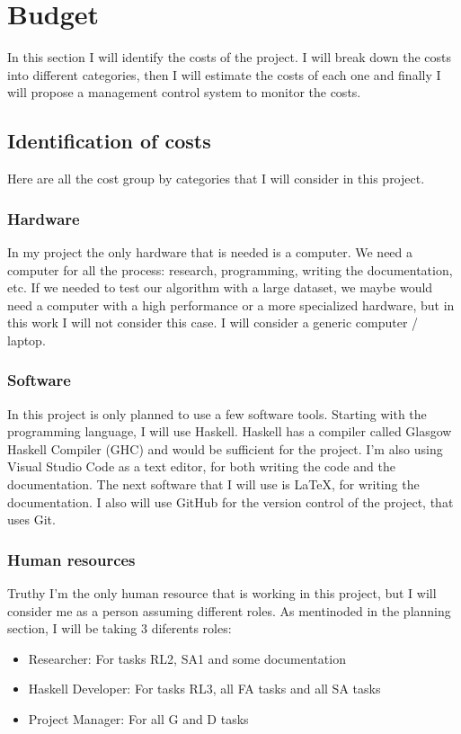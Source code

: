 \chapter{Budget}
In this section I will identify the costs of the project. 
I will break down the costs into different categories, then I will estimate the costs of each one and finally I will propose a management control system to monitor the costs.
\section{Identification of costs}
Here are all the cost group by categories that I will consider in this project.
\subsection*{Hardware}
In my project the only hardware that is needed is a computer.
We need a computer for all the process: research, programming, writing the documentation, etc.
If we needed to test our algorithm with a large dataset, we maybe would need a computer with a high performance or a more specialized hardware, but in this work I will not consider this case.
I will consider a generic computer / laptop.
\subsection*{Software}
In this project is only planned to use a few software tools.
Starting with the programming language, I will use Haskell.
Haskell has a compiler called Glasgow Haskell Compiler (GHC) and would be sufficient for the project.
I'm also using Visual Studio Code as a text editor, for both writing the code and the documentation.
The next software that I will use is \LaTeX, for writing the documentation.
I also will use GitHub for the version control of the project, that uses Git.
\subsection*{Human resources}
Truthy I'm the only human resource that is working in this project, but I will consider me as a person assuming different roles.
As mentinoded in the planning section, I will be taking 3 diferents roles:
\begin{itemize}
    \item Researcher: For tasks RL2, SA1 and some documentation
    \item Haskell Developer: For tasks RL3, all FA tasks and all SA tasks
    \item Project Manager: For all G and D tasks
\end{itemize}
